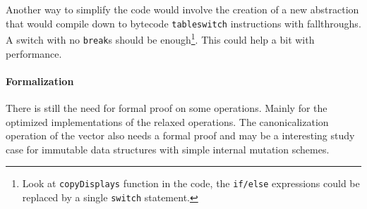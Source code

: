Another way to simplify the code would involve the creation of a new abstraction that would compile down to bytecode \texttt{tableswitch} instructions with fallthroughs. A switch with no \texttt{break}s should be enough\footnote{Look at \texttt{copyDisplays} function in the code, the \texttt{if/else} expressions could be replaced by a single \texttt{switch} statement.}. This could help a bit with performance.

\paragraph{Formalization}
There is still the need for formal proof on some operations. Mainly for the optimized implementations of the relaxed operations. The canonicalization operation of the vector also needs a formal proof and may be a interesting study case for immutable data structures with simple internal mutation schemes.